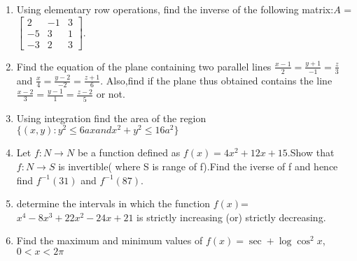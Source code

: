 \documentclass[12pt,-letter paper]{article}
\providecommand{\myvec}[1]{\ensuremath{\begin{bmatrix}#1\end{bmatrix}}}
\begin{document}
\begin{enumerate}
\item
    Using elementary row operations, find the inverse of the following matrix:$A$ = $\myvec {2 & -1 & 3 \\-5 & 3 & 1 \\-3& 2 & 3} $.

\item
     Find the equation of the plane containing two parallel lines  $\frac{x-1}{2}=\frac{y+1}{-1}=\frac{z}{3}$ and $\frac{x}{4}=\frac{y-2}{-2}=\frac{z+1}{6}.$ Also,find if the plane thus obtained contains  the line $\frac{x-2}{3}=\frac{y-1}{1}=\frac{z-2}{5}$ or not.
\item
	Using integration find the area of the region $\{(x,y):y^2 \leq 6 ax and x^2+y^2 \leq 16a^2\}$
\item
	Let $f : N \rightarrow N$ be a function defined as $f(x)= 4x^{2}+12x+15$.Show that $f:N \rightarrow S$ is invertible( where S is range of f).Find the iverse of f and hence find $f^{-1}(31)$ and $f^{-1}(87)$.
\item
	determine the intervals in which the function $f(x)$=$x^4-8x^3+22x^2-24x+21$ is strictly increasing (or) strictly decreasing.
\item
	Find the maximum and minimum values of $f(x) =\sec+\log\cos^2{x}$,$0<x<2\pi$

\end{enumerate}
\end{document}
